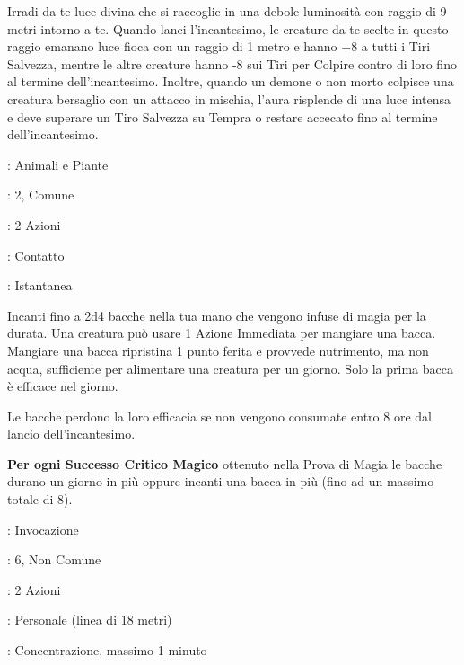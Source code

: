 \begin{multicols}{2}
Irradi da te luce divina che si raccoglie in una debole luminosità con raggio di 9 metri intorno a te. Quando lanci l'incantesimo, le creature da te scelte in questo raggio emanano luce fioca con un raggio di 1 metro e hanno +8 a tutti i Tiri Salvezza, mentre le altre creature hanno -8 sui Tiri per Colpire contro di loro fino al termine dell'incantesimo. Inoltre, quando un demone o non morto colpisce una creatura bersaglio con un attacco in mischia, l'aura risplende di una luce intensa e deve superare un Tiro Salvezza su Tempra o restare accecato fino al termine dell'incantesimo.

\noindent\colorbox{OBSSgold!10}{
\begin{minipage}{0.95\linewidth}
\begin{description}[noitemsep, topsep=0pt, parsep=0pt, partopsep=0pt, leftmargin=0cm, labelwidth=1.3cm]
	\item[\textbf{Lista}]: Animali e Piante
	\item[\textbf{Livello}]: 2, Comune
	\item[\textbf{Lancio}]: 2 Azioni
	\item[\textbf{Gittata}]: Contatto
	\item[\textbf{Durata}]: Istantanea
\end{description}
\end{minipage}}\smallskip

Incanti fino a 2d4 bacche nella tua mano che vengono infuse di magia per la durata. Una creatura può usare 1 Azione Immediata per mangiare una bacca. Mangiare una bacca ripristina 1 punto ferita e provvede nutrimento, ma non acqua, sufficiente per alimentare una creatura per un giorno. Solo la prima bacca è efficace nel giorno.

Le bacche perdono la loro efficacia se non vengono consumate entro 8 ore dal lancio dell'incantesimo.

\textbf{Per ogni Successo Critico Magico} ottenuto nella Prova di Magia le bacche durano un giorno in più oppure incanti una bacca in più (fino ad un massimo totale di 8).

\noindent
\begin{description}[noitemsep, topsep=0pt, parsep=0pt, partopsep=0pt, leftmargin=0cm, labelwidth=1.3cm]
	\item[\textbf{Lista}]: Invocazione
	\item[\textbf{Livello}]: 6, Non Comune
	\item[\textbf{Lancio}]: 2 Azioni
	\item[\textbf{Gittata}]: Personale (linea di 18 metri)
	\item[\textbf{Durata}]: Concentrazione, massimo 1 minuto
\end{description}


\end{multicols}
